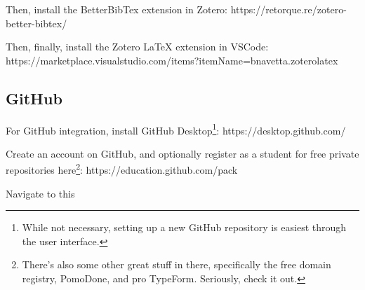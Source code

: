 Then, install the BetterBibTex extension in Zotero: https://retorque.re/zotero-better-bibtex/

Then, finally, install the Zotero LaTeX extension in VSCode: https://marketplace.visualstudio.com/items?itemName=bnavetta.zoterolatex

\subsection{GitHub}

For GitHub integration, install GitHub Desktop\footnote{While not necessary, setting up a new GitHub repository is easiest through the user interface.}: https://desktop.github.com/ 

Create an account on GitHub, and optionally register as a student for free private repositories here\footnote{There's also some other great stuff in there, specifically the free domain registry, PomoDone, and pro TypeForm. Seriously, check it out.}: https://education.github.com/pack 

Navigate to this 